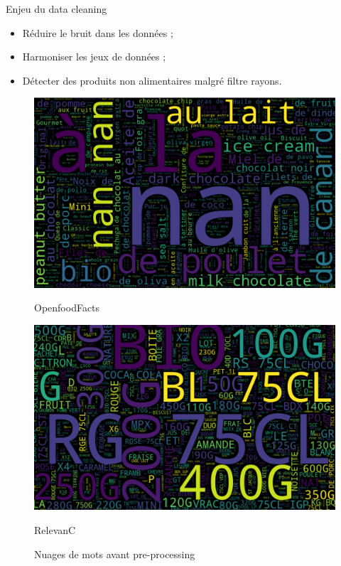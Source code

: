 \documentclass[ignorenonframetext,]{beamer}
\begin{document}
\begin{frame}{Enjeu du data cleaning}

\begin{itemize}
    \item Réduire le bruit dans les données ;
    \item Harmoniser les jeux de données ;
    \item Détecter des produits non alimentaires malgré filtre rayons.
\end{itemize}

    \begin{figure}[ht]
        \begin{minipage}[b]{0.45\linewidth}
            \centering
            \includegraphics[width=\textwidth]{images/openfood_start.png}
            \caption{OpenfoodFacts}
            \label{fig: wordcloud openfood}
        \end{minipage}
        \hspace{0.5cm}
        \begin{minipage}[b]{0.45\linewidth}
            \centering
            \includegraphics[width=\textwidth]{images/relevanc_start.png}
            \caption{RelevanC}
            \label{fig: wordcloud relevanc}
        \end{minipage}
        \caption{Nuages de mots avant pre-processing}
    \end{figure}


\end{frame}
    
\end{document}
